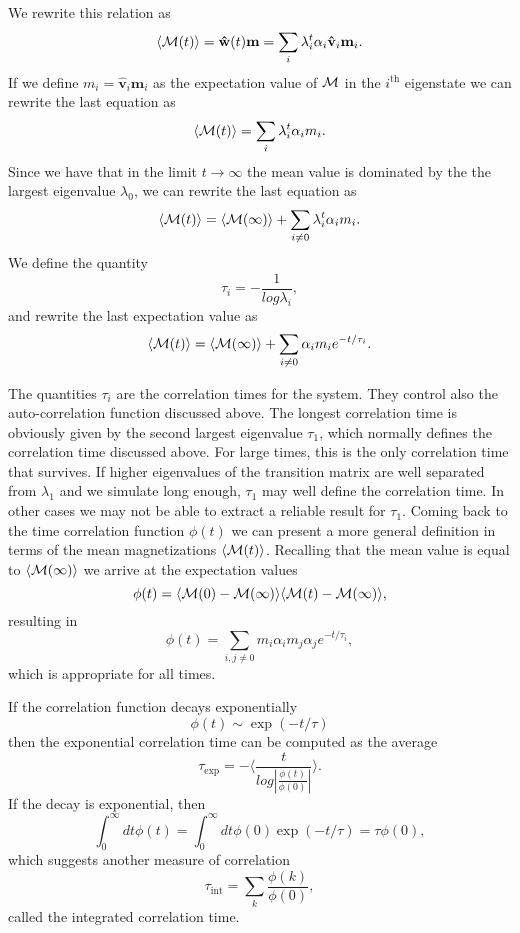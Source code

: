 \documentclass[graybox,sectrefs,envcountresetchap,open=right]{svmonodo}
\begin{document}
We rewrite this relation  as
 \[
 \langle {\cal M}(t) \rangle  = \mathbf{\hat{w}}(t)\mathbf{m}=\sum_i\lambda_i^t\alpha_i\mathbf{\hat{v}}_i\mathbf{m}_i.
\] 
If we define $m_i=\mathbf{\hat{v}}_i\mathbf{m}_i$ as the expectation value of
${\cal M}$ in the $i^{\mathrm{th}}$ eigenstate we can rewrite the last equation as
 \[
 \langle {\cal M}(t) \rangle  = \sum_i\lambda_i^t\alpha_im_i.
\] 
Since we have that in the limit $t\rightarrow \infty$ the mean value is dominated by the 
the largest eigenvalue $\lambda_0$, we can rewrite the last equation as
 \[
 \langle {\cal M}(t) \rangle  = \langle {\cal M}(\infty) \rangle+\sum_{i\ne 0}\lambda_i^t\alpha_im_i.
\] 
We define the quantity
\[
   \tau_i=-\frac{1}{log\lambda_i},
\]
and rewrite the last expectation value as
 \[
 \langle {\cal M}(t) \rangle  = \langle {\cal M}(\infty) \rangle+\sum_{i\ne 0}\alpha_im_ie^{-t/\tau_i}.
\label{eq:finalmeanm}
\] 




The quantities $\tau_i$ are the correlation times for the system. They control also the auto-correlation function 
discussed above.  The longest correlation time is obviously given by the second largest
eigenvalue $\tau_1$, which normally defines the correlation time discussed above. For large times, this is the 
only correlation time that survives. If higher eigenvalues of the transition matrix are well separated from 
$\lambda_1$ and we simulate long enough,  $\tau_1$ may well define the correlation time. 
In other cases we may not be able to extract a reliable result for $\tau_1$. 
Coming back to the time correlation function $\phi(t)$ we can present a more general definition in terms
of the mean magnetizations $ \langle {\cal M}(t) \rangle$. Recalling that the mean value is equal 
to $ \langle {\cal M}(\infty) \rangle$ we arrive at the expectation values
\[
\phi(t) =\langle {\cal M}(0)-{\cal M}(\infty)\rangle \langle {\cal M}(t)-{\cal M}(\infty)\rangle,
\]
resulting in
\[
\phi(t) =\sum_{i,j\ne 0}m_i\alpha_im_j\alpha_je^{-t/\tau_i},
\]
which is appropriate for all times.




If the correlation function decays exponentially
\[ \phi (t) \sim \exp{(-t/\tau)}\]
then the exponential correlation time can be computed as the average
\[   \tau_{\mathrm{exp}}  =  -\langle  \frac{t}{log|\frac{\phi(t)}{\phi(0)}|} \rangle. \]
If the decay is exponential, then
\[  \int_0^{\infty} dt \phi(t)  = \int_0^{\infty} dt \phi(0)\exp{(-t/\tau)}  = \tau \phi(0),\] 
which  suggests another measure of correlation
\[   \tau_{\mathrm{int}} = \sum_k \frac{\phi(k)}{\phi(0)}, \]
called the integrated correlation time.
\end{document}
